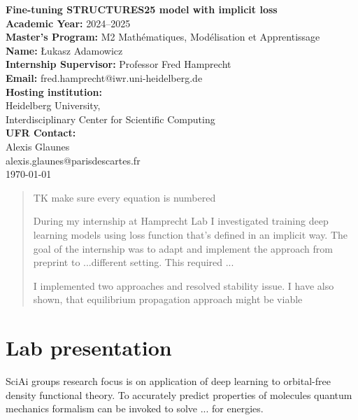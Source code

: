 \documentclass[a4paper,10pt]{report}
\author{Łukasz Adamowicz}
\begin{document}
\begin{titlepage}
    \begin{center}
        \textbf{\Large Fine-tuning STRUCTURES25 model with implicit loss}\\[2cm]
        \textbf{Academic Year:} 2024--2025\\
        \textbf{Master's Program:} M2 Mathématiques, Modélisation et Apprentissage\\
        \textbf{Name:} Łukasz Adamowicz\\[1cm]
        \textbf{Internship Supervisor:} Professor Fred Hamprecht\\
        \textbf{Email:} fred.hamprecht@iwr.uni-heidelberg.de\\[1cm]
        \textbf{Hosting institution:}\\
        Heidelberg University,\\
        Interdisciplinary Center for Scientific Computing\\
        \textbf{UFR Contact:}\\
        Alexis Glaunes\\
        alexis.glaunes@parisdescartes.fr\\[2cm]

        \vfill
        \today
    \end{center}
\end{titlepage}


\begin{abstract}
TK make sure every equation is numbered

During my internship at Hamprecht Lab I investigated training deep learning models using loss function that's defined in an implicit way.
The goal of the internship was to adapt and implement the approach from  preprint \cite{neuralscf} to ...different setting. This required ...

I implemented two approaches and resolved stability issue. I have also shown, that equilibrium propagation approach might be viable
\end{abstract}


\tableofcontents
\newpage
\section{Lab presentation}
SciAi groups research focus is on application of deep learning to orbital-free density functional theory.
To accurately predict properties of molecules quantum mechanics formalism can be invoked to solve ... for energies.
\end{document}
